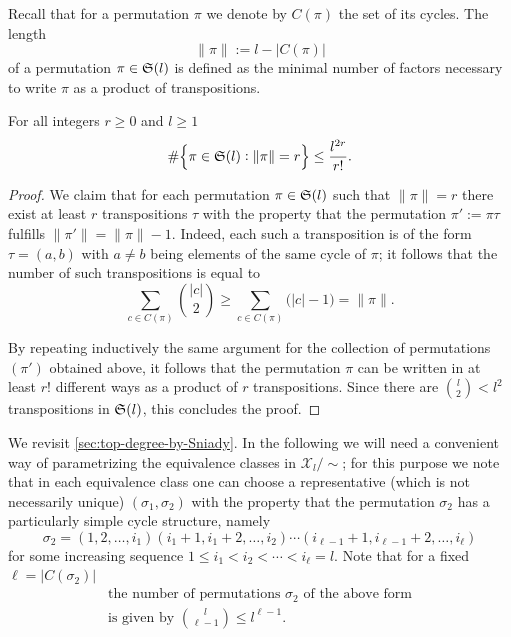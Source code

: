 \documentclass[12pt,usenames,dvipsnames,svgnames,table]{amsart}
\begin{document}
Recall that for a permutation $\pi$ we denote by $C(\pi)$ the set of its cycles.
The length 
\[\|\pi\|:=l - |C(\pi)|\] 
of a permutation $\pi\in\mathfrak{S}(l)$ is defined as the minimal number of factors
necessary to write $\pi$ as a product of transpositions.
\begin{lemma}
	\label{lem:not-many-permutations}
	For all integers $r\geq 0$ and $l\geq 1$
	\[ \#\Big\{ \pi\in\mathfrak{S}(l) : \| \pi\| = r \Big\} \leq \frac{l^{2r}}{r!}. \]
\end{lemma}
\begin{proof}
	We claim that for each permutation $\pi\in\mathfrak{S}(l)$ such that $\|\pi\|=r$ there exist
	at least $r$ transpositions $\tau$ with the property that the permutation 
	$\pi':= \pi \tau$ fulfills $\| \pi'\|=\|\pi\|-1$. Indeed, each such a transposition
	is of the form $\tau=(a,b)$ with $a\neq b$ being elements of the same cycle of
	$\pi$; it follows that the number of such transpositions is equal to
	\[ \sum_{c\in C(\pi)} \binom{|c|}{2} \geq \sum_{c\in C(\pi)} \big( |c|-1  \big) = \|\pi\|. \]
	
	By repeating inductively the same argument for the collection of permutations $(\pi')$ obtained above,
	it follows that the permutation $\pi$ can be written in at least $r!$ 
	different ways as a product of $r$ transpositions. Since there are $\binom{l}{2}<l^2$
	transpositions in $\mathfrak{S}(l)$, this concludes the proof.
\end{proof}

We revisit \cref{sec:top-degree-by-Sniady}.
In the following we will need a convenient way of parametrizing 
the equivalence classes in $\mathcal{X}_l/\sim$;
for this purpose we note that in each equivalence class one can choose a representative (which is not necessarily unique)
$(\sigma_1,\sigma_2)$ with the property that the permutation $\sigma_2$ has a particularly simple
cycle structure, namely
\[ \sigma_2=(1,2,\dots,i_1)(i_1+1,i_1+2,\dots,i_2) \cdots (i_{\ell-1}+1,i_{\ell-1}+2,\dots,i_\ell)\]
for some increasing sequence $1\leq i_1<i_2<\cdots<i_\ell=l$.
Note that for a fixed $\ell=|C(\sigma_2)|$
\begin{multline} 
\label{eq:takietam}
\text{the number of permutations } \sigma_2 \text{ of the above form}\\
\text{is given by } \binom{l}{\ell-1} \leq l^{\ell-1}.
\end{multline}
\end{document}
